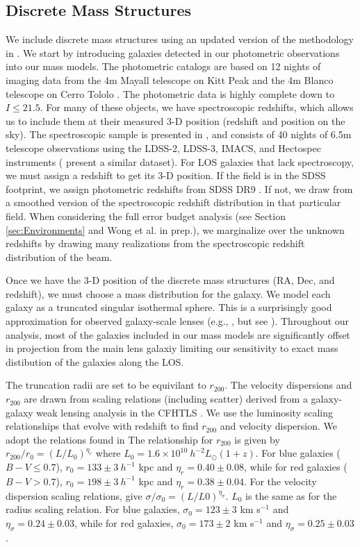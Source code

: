 \documentclass{emulateapj}
\begin{document}
\subsection{Discrete Mass Structures}
We include discrete mass structures using an updated version of the methodology in \citet{Wong11}. We start by introducing galaxies detected in our photometric observations into our mass models. The photometric catalogs are based on 12 nights of imaging data from the 4m Mayall telescope on Kitt Peak and the 4m Blanco telescope on Cerro Tololo \citep{Williams06}. The photometric data is highly complete down to $I \leq 21.5$. For many of these objects, we have spectroscopic redshifts, which allows us to include them at their measured 3-D position (redshift and position on the sky). The spectroscopic sample is presented in \citet{Momcheva15}, and consists of 40 nights of 6.5m telescope observations using the LDSS-2, LDSS-3, IMACS, and Hectospec instruments (\citealt{Sluse16} present a similar dataset).
For LOS galaxies that lack spectroscopy, we must assign a redshift to get its 3-D position. If the field is in the SDSS footprint, we assign photometric redshifts from SDSS DR9 \citep{Ahn12, Csabai03}. If not, we draw from a smoothed version of the spectroscopic redshift distribution in that particular field. When considering the full error budget analysis (see Section \ref{sec:Environments} and Wong et al. in prep.), we marginalize over the unknown redshifts by drawing many realizations from the spectroscopic redshift distribution of the beam. 

Once we have the 3-D position of the discrete mass structures (RA, Dec, and redshift), we must choose a mass distribution for the galaxy. We model each galaxy as a truncated singular isothermal sphere. This is a surprisingly good approximation for observed galaxy-scale lenses (e.g., \citealt{Rusin03, Gavazzi07, Koopmans09}, but see \citealt{Xu16}). Throughout our analysis, most of the galaxies included in our mass models are significantly offset in projection from the main lens galaxiy limiting our sensitivity to exact mass distibution of the galaxies along the LOS.

The truncation radii are set to be equivilant to $r_{200}$. The velocity dispersions and $r_{200}$ are drawn from scaling relations (including scatter) derived from a galaxy-galaxy weak lensing analysis in the CFHTLS \citep{Brimioulle13}. We use the luminosity scaling relationships that evolve with redshift to find $r_{200}$ and velocity dispersion. We adopt the relations found in \citet{Brimioulle13} The relationship for $r_{200}$ is given by 
$r_{200}/r_0 = (L / L_0)^{\eta_r}$ where $L_0 = 1.6 \times 10^{10}\  h^{-2} L_\odot (1+z)$. For blue galaxies ($B-V \leq 0.7$), $r_0 = 133 \pm 3 \ h^{-1}$ kpc and $\eta_r = 0.40 \pm 0.08$, while for red galaxies ($B-V > 0.7$), $r_0 = 198 \pm 3 \  h^{-1}$ kpc and $\eta_r = 0.38 \pm 0.04$. For the velocity dispersion scaling relations, \citet{Brimioulle13} give $\sigma / \sigma_0 = (L / L0) ^{\eta_\sigma}$. $L_0$ is the same as for the radius scaling relation. For blue galaxies, $\sigma_0 = 123 \pm 3$ km s$^{-1}$ and $\eta_\sigma = 0.24 \pm 0.03$, while for red galaxies, $\sigma_0 = 173 \pm 2$ km s$^{-1}$ and $\eta_\sigma = 0.25 \pm 0.03$.
\end{document}
